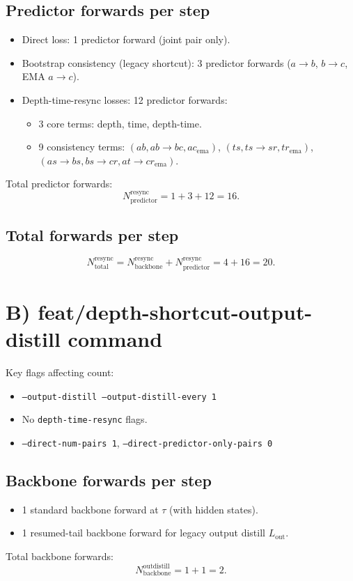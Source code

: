 \documentclass[11pt]{article}
\begin{document}
\subsection*{Predictor forwards per step}
\begin{itemize}[leftmargin=*]
  \item Direct loss: 1 predictor forward (joint pair only).
  \item Bootstrap consistency (legacy shortcut): 3 predictor forwards
  (\(a\!\to\!b\), \(b\!\to\!c\), EMA \(a\!\to\!c\)).
  \item Depth-time-resync losses: 12 predictor forwards:
  \begin{itemize}[leftmargin=*]
    \item 3 core terms: depth, time, depth-time.
    \item 9 consistency terms:
    \((ab,ab\!\to\!bc,ac_{\text{ema}})\),
    \((ts,ts\!\to\!sr,tr_{\text{ema}})\),
    \((as\!\to\!bs,bs\!\to\!cr,at\!\to\!cr_{\text{ema}})\).
  \end{itemize}
\end{itemize}
Total predictor forwards:
\[
N_{\text{predictor}}^{\text{resync}} = 1 + 3 + 12 = 16.
\]

\subsection*{Total forwards per step}
\[
N_{\text{total}}^{\text{resync}} = N_{\text{backbone}}^{\text{resync}} + N_{\text{predictor}}^{\text{resync}} = 4 + 16 = 20.
\]

\section{B) feat/depth-shortcut-output-distill command}

Key flags affecting count:
\begin{itemize}[leftmargin=*]
  \item \texttt{--output-distill --output-distill-every 1}
  \item No \texttt{depth-time-resync} flags.
  \item \texttt{--direct-num-pairs 1}, \texttt{--direct-predictor-only-pairs 0}
\end{itemize}

\subsection*{Backbone forwards per step}
\begin{itemize}[leftmargin=*]
  \item 1 standard backbone forward at \(\tau\) (with hidden states).
  \item 1 resumed-tail backbone forward for legacy output distill \(L_{\text{out}}\).
\end{itemize}
Total backbone forwards:
\[
N_{\text{backbone}}^{\text{outdistill}} = 1 + 1 = 2.
\]
\end{document}
